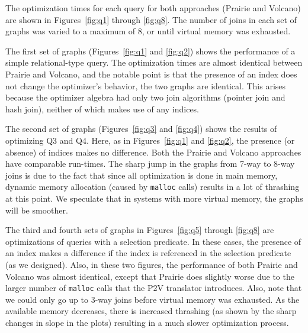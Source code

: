 The optimization times for each query for both approaches (Prairie and
Volcano) are shown in Figures~\ref{fig:q1} through \ref{fig:q8}.  The
number of joins in each set of graphs was varied to a maximum of 8, or
until virtual memory was exhausted.

The first set of graphs (Figures~\ref{fig:q1} and \ref{fig:q2})
shows the performance of a simple relational-type query.  The
optimization times are almost identical between Prairie and Volcano,
and the notable point is that the presence of an index does not change
the optimizer's behavior, \ie the two graphs are identical.  This
arises because the optimizer algebra had only two join algorithms
(pointer join and hash join), neither of which makes use of any
indices.

The second set of graphs (Figures~\ref{fig:q3} and \ref{fig:q4}) shows
the results of optimizing Q3 and Q4.  Here, as in Figures~\ref{fig:q1}
and \ref{fig:q2}, the presence (or absence) of indices makes no
difference.  Both the Prairie and Volcano approaches have comparable
run-times.  The sharp jump in the graphs from 7-way to 8-way joins is
due to the fact that since all optimization is done in main memory,
dynamic memory allocation (caused by \texttt{malloc} calls) results in
a lot of thrashing at this point.  We speculate that in systems with
more virtual memory, the graphs will be smoother.

The third and fourth sets of graphs in Figures~\ref{fig:q5} through
\ref{fig:q8} are optimizations of queries with a selection predicate.
In these cases, the presence of an index makes a difference if the
index is referenced in the selection predicate (as we designed).  Also,
in these two figures, the performance of both Prairie and Volcano was
almost identical, except that Prairie does slightly worse due to the
larger number of \texttt{malloc} calls that the P2V translator
introduces.  Also, note that we could only go up to 3-way joins before
virtual memory was exhausted.  As the available memory decreases, there
is increased thrashing (as shown by the sharp changes in slope in the
plots) resulting in a much slower optimization process.

